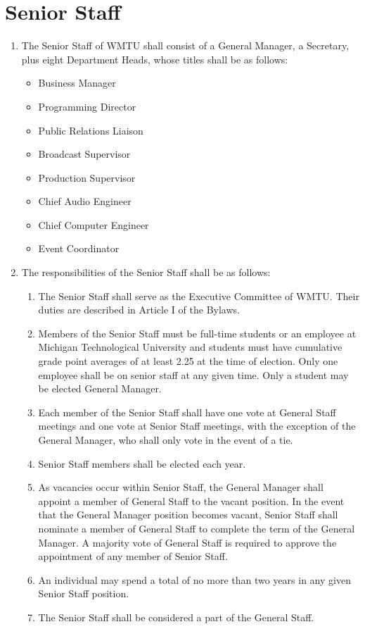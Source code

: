 \documentclass[12pt]{constitution}
\begin{document}
\section{Senior Staff}
\begin{enumerate}
\item The Senior Staff of WMTU shall consist of a General Manager, a Secretary, plus eight Department Heads, whose titles shall be as follows:
\begin{itemize}
\item Business Manager
\item Programming Director
\item Public Relations Liaison
\item Broadcast Supervisor
\item Production Supervisor
\item Chief Audio Engineer
\item Chief Computer Engineer
\item Event Coordinator
\end{itemize}
\item The responsibilities of the Senior Staff shall be as follows:
\begin{enumerate}
\item The Senior Staff shall serve as the Executive Committee of WMTU. Their duties are described in Article I of the Bylaws.
\item Members of the Senior Staff must be full-­time students or an employee at Michigan Technological University and students must have cumulative grade point averages of at least 2.25 ​at the time of election. Only one employee shall be on senior staff at any given time. Only a student may be elected General Manager.
\item Each member of the Senior Staff shall have one vote at General Staff meetings and one vote at Senior Staff meetings, with the exception of the General Manager, who shall only vote in the event of a tie.
\item Senior Staff members shall be elected each year.
\item As vacancies occur within Senior Staff, the General Manager shall appoint a member of General Staff to the vacant position. In the event that the General Manager position becomes vacant, Senior Staff shall nominate a member of General Staff to complete the term of the General Manager. A majority vote of General Staff is required to approve the appointment of any member of Senior Staff.
\item An individual may spend a total of no more than two years in any given Senior Staff position.
\item The Senior Staff shall be considered a part of the General Staff.
\end{enumerate}
\end{enumerate}
\end{document}
